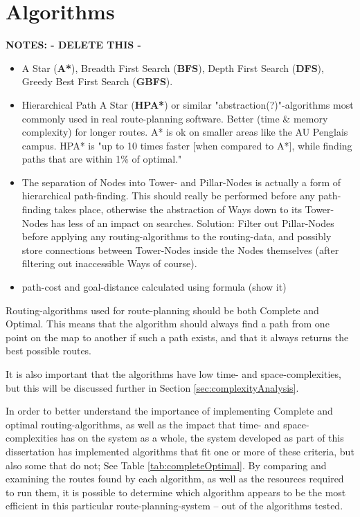 \section{Algorithms}
\textbf{NOTES: - DELETE THIS -}
\begin{itemize}
	\item A Star (\textbf{A*}), Breadth First Search (\textbf{BFS}), Depth First Search (\textbf{DFS}), Greedy Best First Search (\textbf{GBFS}).
	\item Hierarchical Path A Star (\textbf{HPA*}) or similar "abstraction(?)"-algorithms most commonly used in real route-planning software. Better (time \& memory complexity) for longer routes. A* is ok on smaller areas like the AU Penglais campus.
	\subitem HPA* is "up to 10 times faster [when compared to A*], while finding paths that are within 1\% of optimal."\cite{botea-etal-jogd04}
	\item The separation of Nodes into Tower- and Pillar-Nodes is actually a form of hierarchical path-finding.
	\subitem This should really be performed before any path-finding takes place, otherwise the abstraction of Ways down to its Tower-Nodes has less of an impact on searches.
	\subsubitem Solution: Filter out Pillar-Nodes before applying any routing-algorithms to the routing-data, and possibly store connections between Tower-Nodes inside the Nodes themselves (after filtering out inaccessible Ways of course).
	\item path-cost and goal-distance calculated using formula (show it)
\end{itemize}

Routing-algorithms used for route-planning should be both Complete and Optimal. This means that the algorithm should always find a path from one point on the map to another if such a path exists, and that it always returns the best possible routes.

It is also important that the algorithms have low time- and space-complexities, but this will be discussed further in Section \ref{sec:complexityAnalysis}.

In order to better understand the importance of implementing Complete and optimal routing-algorithms, as well as the impact that time- and space-complexities has on the system as a whole, the system developed as part of this dissertation has implemented algorithms that fit one or more of these criteria, but also some that do not; See Table \ref{tab:completeOptimal}. By comparing and examining the routes found by each algorithm, as well as the resources required to run them, it is possible to determine which algorithm appears to be the most efficient in this particular route-planning-system -- out of the algorithms tested.

